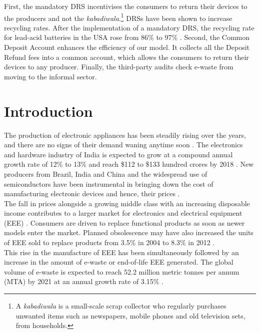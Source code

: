 \documentclass[a4paper, 12pt]{article}
\begin{document}
                     First, the mandatory DRS incentivises the consumers to return their devices to the producers and not the \textit{kabadiwala}.\footnote{A \textit{kabadiwala} is a small-scale scrap collector who regularly purchases unwanted items such as newspapers, mobile phones and old television sets, from households.} DRSs have been shown to increase recycling rates. After the implementation of a mandatory DRS, the recycling rate for lead-acid batteries in the USA rose from 86\% to 97\% \parencite{wallspaper}. Second, the Common Deposit Account enhances the efficiency of our model. It collects all the Deposit Refund fees into a common account, which allows the consumers to return their devices to any producer. Finally, the third-party audits check e-waste from moving to the informal sector.\\
                    
\newpage
\section{Introduction}
                    
                    The production of electronic appliances has been steadily rising over the years, and there are no signs of their demand waning anytime soon \parencite{chidambarampaper}. The electronics and hardware industry of India is expected to grow at a compound annual growth rate of 12\% to 13\% and reach \$112 to \$133 hundred crores by 2018 \parencite{assochameyreport}. New producers from Brazil, India and China and the widespread use of semiconductors have been instrumental in bringing down the cost of manufacturing electronic devices and hence, their prices \parencite{ahmednews}. \\
                    
                    The fall in prices alongside a growing middle class with an increasing disposable income contributes to a larger market for electronics and electrical equipment (EEE) \parencite{assochamnecreport}. Consumers are driven to replace functional products as soon as newer models enter the market. Planned obsolescence may have also increased the units of EEE sold to replace products from 3.5\% in 2004 to 8.3\% in 2012 \parencite{alanews}. \\
                   
                   This rise in the manufacture of EEE has been simultaneously followed by an increase in the amount of e-waste or end-of-life EEE generated. The global volume of e-waste is expected to reach 52.2 million metric tonnes per annum (MTA) by 2021 at an annual growth rate of 3.15\% \parencite{assochamstats}. \\ 
                    
\end{document}
